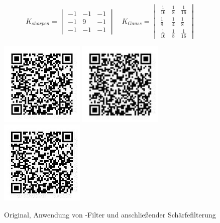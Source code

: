 \begin{equation}
  K_{sharpen} = \begin{vmatrix}
    -1 & -1 & -1 \\
    -1 &  9 & -1 \\
    -1 & -1 & -1
  \end{vmatrix}
  \quad
  K_{Gauss} = \begin{vmatrix}
    \frac{1}{16} & \frac{1}{8} & \frac{1}{16} \\
    \frac{1}{ 8} & \frac{1}{4} & \frac{1}{ 8} \\
    \frac{1}{16} & \frac{1}{8} & \frac{1}{16}
  \end{vmatrix}
\end{equation}
\begin{figure}[H]
  \centering
  \includegraphics[height=4cm]{img/QR/perfect_03.jpg}
  \includegraphics[height=4cm]{img/QR/qr-gauss.jpg}
  \includegraphics[height=4cm]{img/QR/qr-sharp.jpg}
  \caption[Beispiel -Filter]{Original, Anwendung von -Filter und anschließender Schärfefilterung}
  \label{fig:sharpgauss}
\end{figure}

